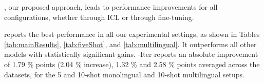 
\our, our proposed approach, leads to performance improvements for all configurations, whether through ICL or through fine-tuning. 

reports the best performance in all our experimental settings, %
as shown in Tables \ref{tab:mainResults}, \ref{tab:fiveShot}, and \ref{tab:multilingual}. It outperforms all other models with statistically significant gains. \our-Iter reports an absolute improvement of 1.79 \% points (2.04 \% increase),  1.32 \% and 2.58 \% points averaged across the datasets, for the 5 and 10-shot monolingual and 10-shot multilingual setups.





